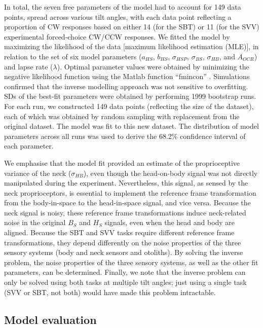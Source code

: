 In total, the seven free parameters of the model had to account for 149 data points, spread across various tilt angles, with each data point reflecting a proportion of CW responses based on either 14 (for the SBT) or 11 (for the SVV) experimental forced-choice CW/CCW responses. We fitted the model by maximizing the likelihood of the data [maximum likelihood estimation (MLE)], in relation to the set of six model parameters ($a_{HS}$, $b_{HS}$, $\sigma_{HSP}$, $\sigma_{BS}$, $\sigma_{HB}$, and $A_{OCR}$) and lapse rate ($\lambda$). Optimal parameter values were obtained by minimizing the negative likelihood function using the Matlab function ``fmincon'' \cite{devrijer2008, mcguire2009}. Simulations confirmed that the inverse modelling approach was not sensitive to overfitting. SDs of the best-fit parameters were obtained by performing 1999 bootstrap runs. For each run, we constructed 149 data points (reflecting the size of the dataset), each of which was obtained by random sampling with replacement from the original dataset. The model was fit to this new dataset. The distribution of model parameters across all runs was used to derive the 68.2\% confidence interval of each parameter.

We emphasise that the model fit provided an estimate of the proprioceptive variance of the neck ($\sigma_{HB}$), even though the head-on-body signal was not directly manipulated during the experiment. Nevertheless, this signal, as sensed by the neck proprioceptors, is essential to implement the reference frame transformation from the body-in-space to the head-in-space signal, and vice versa. Because the neck signal is noisy, these reference frame transformations induce neck-related noise in the original $B_S$ and $H_S$ signals, even when the head and body are aligned. Because the SBT and SVV tasks require different reference frame transformations, they depend differently on the noise properties of the three sensory systems (body and neck sensors and otoliths). By solving the inverse problem, the noise properties of the three sensory systems, as well as the other fit parameters, can be determined. Finally, we note that the inverse problem can only be solved using both tasks at multiple tilt angles; just using a single task (SVV or SBT, not both) would have made this problem intractable.

\subsection{Model evaluation}

